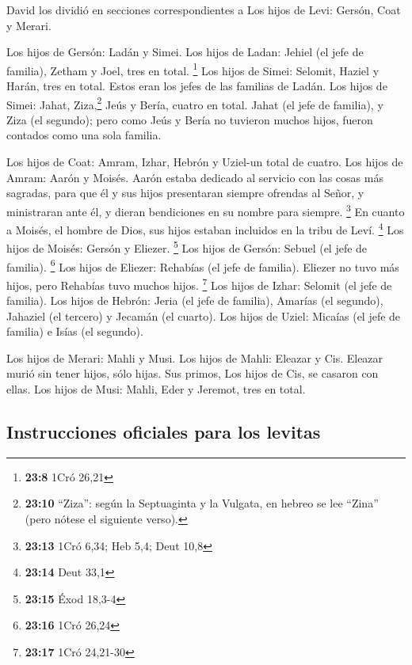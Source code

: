  David los dividió en secciones correspondientes a Los
hijos de Levi: Gersón, Coat y Merari.

 Los hijos de Gersón: Ladán y Simei.  Los
hijos de Ladan: Jehiel (el jefe de familia), Zetham y Joel, tres en
total. \footnote{\textbf{23:8} 1Cró 26,21}  Los hijos de
Simei: Selomit, Haziel y Harán, tres en total. Estos eran los jefes de
las familias de Ladán.  Los hijos de Simei: Jahat,
Ziza,\footnote{\textbf{23:10} ``Ziza'': según la Septuaginta y la
  Vulgata, en hebreo se lee ``Zina'' (pero nótese el siguiente verso).}
Jeús y Bería, cuatro en total.  Jahat (el jefe de
familia), y Ziza (el segundo); pero como Jeús y Bería no tuvieron muchos
hijos, fueron contados como una sola familia.

 Los hijos de Coat: Amram, Izhar, Hebrón y Uziel-un total
de cuatro.  Los hijos de Amram: Aarón y Moisés. Aarón
estaba dedicado al servicio con las cosas más sagradas, para que él y
sus hijos presentaran siempre ofrendas al Señor, y ministraran ante él,
y dieran bendiciones en su nombre para siempre. \footnote{\textbf{23:13}
  1Cró 6,34; Heb 5,4; Deut 10,8}  En cuanto a Moisés, el
hombre de Dios, sus hijos estaban incluidos en la tribu de Leví.
\footnote{\textbf{23:14} Deut 33,1}  Los hijos de Moisés:
Gersón y Eliezer. \footnote{\textbf{23:15} Éxod 18,3-4} 
Los hijos de Gersón: Sebuel (el jefe de familia). \footnote{\textbf{23:16}
  1Cró 26,24}  Los hijos de Eliezer: Rehabías (el jefe de
familia). Eliezer no tuvo más hijos, pero Rehabías tuvo muchos hijos.
\footnote{\textbf{23:17} 1Cró 24,21-30}  Los hijos de
Izhar: Selomit (el jefe de familia).  Los hijos de
Hebrón: Jeria (el jefe de familia), Amarías (el segundo), Jahaziel (el
tercero) y Jecamán (el cuarto).  Los hijos de Uziel:
Micaías (el jefe de familia) e Isías (el segundo).

 Los hijos de Merari: Mahli y Musi. Los hijos de Mahli:
Eleazar y Cis.  Eleazar murió sin tener hijos, sólo
hijas. Sus primos, Los hijos de Cis, se casaron con ellas.
 Los hijos de Musi: Mahli, Eder y Jeremot, tres en total.

\hypertarget{instrucciones-oficiales-para-los-levitas}{%
\subsection{Instrucciones oficiales para los
levitas}\label{instrucciones-oficiales-para-los-levitas}}

